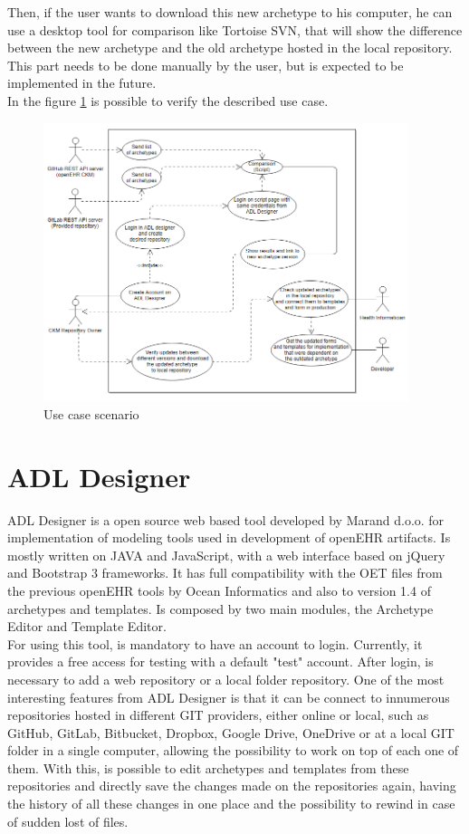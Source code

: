 \documentclass[mim_thesis.tex]{subfiles}
\begin{document}
Then, if the user wants to download this new archetype to his computer, he can use a desktop tool for comparison like Tortoise SVN, that will show the difference between the new archetype and the old archetype hosted in the local repository. This part needs to be done manually by the user, but is expected to be implemented in the future.\\

In the figure \ref{fig:use_case} is possible to verify the described use case. 

\begin{figure}[H]
	\centering
    \includegraphics[width=0.95\textwidth]{img/usecase2.PNG}
	\caption{Use case scenario}
	\label{fig:use_case}
\end{figure}


\newpage
\section{ADL Designer}
ADL Designer is a open source web based tool developed by Marand d.o.o. for implementation of modeling tools used in development of openEHR artifacts. Is mostly written on JAVA and JavaScript, with a web interface based on jQuery and Bootstrap 3 frameworks. It has full compatibility with the OET files from the previous openEHR tools by Ocean Informatics and also to version 1.4 of archetypes and templates. Is composed by two main modules, the Archetype Editor and Template Editor. \\

For using this tool, is mandatory to have an account to login. Currently, it provides a free access for testing with a default "test" account. After login, is necessary to add a web repository or a local folder repository. One of the most interesting features from ADL Designer is that it can be connect to innumerous repositories hosted in different GIT providers, either online or local, such as GitHub, GitLab, Bitbucket, Dropbox, Google Drive, OneDrive or at a local GIT folder in a single computer, allowing the possibility to work on top of each one of them. With this, is possible to edit archetypes and templates from these repositories and directly save the changes made on the repositories again, having the history of all these changes in one place and the possibility to rewind in case of sudden lost of files.\\
\end{document}

